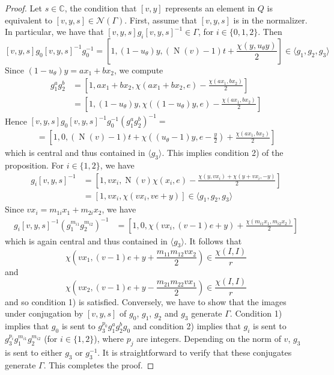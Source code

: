 \documentclass[12pt]{amsart}
\newcommand{\C}{\mathbb{C}}
\DeclareMathOperator{\Norm}{N}
\begin{document}
\begin{proof}
Let $s \in \C$, the condition that $[v,y]$ represents an element in $Q$ is equivalent to $[v,y,s] \in \mathcal{N}(\Gamma)$. First, assume that $[v,y,s]$ is in the normalizer. In particular, we have that  $[v,y,s]g_i[v,y,s]^{-1}\in \Gamma$, for $i \in \{0,1,2\}$. Then 
$$[v,y,s]g_0[v,y,s]^{-1}g_0^{-1}=\left[1, (1-u_\theta)y, (\Norm(v)-1)t +\frac{\chi(y,u_\theta y)}{2}\right] \in \langle g_1,g_2,g_3 \rangle$$
Since $(1-u_\theta)y = ax_1 + bx_2$, we compute
\begin{align*}
g_1^ag_2^b &= \left[1, ax_1+bx_2, \chi(ax_1+bx_2, e)-\frac{\chi(ax_1,bx_2)}{2}\right]\\
&=\left[1,(1-u_\theta)y, \chi((1-u_\theta)y,e)-\frac{\chi(ax_1,bx_2)}{2}\right]
\end{align*}
Hence $[v,y,s]g_0[v,y,s]^{-1}g_0^{-1}(g_1^ag_2^b)^{-1} =$
\begin{align*}
=\left[1,0,(\Norm(v)-1)t + \chi((u_\theta-1)y, e-\frac{y}{2}) +\frac{\chi(ax_1,bx_2)}{2}\right]
\end{align*}
which is central and thus contained in $\langle g_3 \rangle$. This implies condition 2) of the proposition. For $i \in \{1,2\}$, we have
\begin{align*}
[v,y,s]g_i[v,y,s]^{-1}&=\left[1,vx_i,\Norm(v)\chi(x_i,e)-\frac{\chi(y,vx_i) + \chi(y+vx_i,-y)}{2}\right]\\
&=\left[1,vx_i, \chi(vx_i,ve+y)\right] \in \langle g_1,g_2,g_3 \rangle
\end{align*}
Since $vx_i = m_{1i}x_1+m_{2i}x_2$, we have
\begin{align*}
[v,y,s]g_i[v,y,s]^{-1}(g_1^{m_{i1}}g_2^{m_{i2}})^{-1}&= \left[1,0,\chi(vx_i, (v-1)e+y)+\frac{\chi(m_{i1}x_1,m_{i2}x_2)}{2}\right]
\end{align*}
which is again central and thus contained in $\langle g_3 \rangle$. It follows that 
$$\chi(vx_1, (v-1)e+y + \frac{m_{11}m_{12}vx_2}{2}) \in \frac{\chi(I,I)}{r}$$
and
$$\chi(vx_2,(v-1)e+y-\frac{m_{21}m_{22}vx_1}{2})\in \frac{\chi(I,I)}{r}$$
and so condition 1) is satisfied. Conversely, we have to show that the images under conjugation by $[v,y,s]$ of $g_0$, $g_1$, $g_2$ and $g_3$ generate $\Gamma$. Condition 1) implies that $g_0$ is sent to $g_3^{p_0}g_1^ag_2^bg_0$ and condition 2) implies that $g_i$ is sent to $g_3^{p_i}g_1^{m_{i1}}g_2^{m_{i2}}$ (for $i\in \{1,2\}$), where $p_j$ are integers. Depending on the norm of $v$, $g_3$ is sent to either $g_3$ or $g_3^{-1}$. It is straightforward to verify that these conjugates generate $\Gamma$. This completes the proof.
\end{proof}
\end{document}
